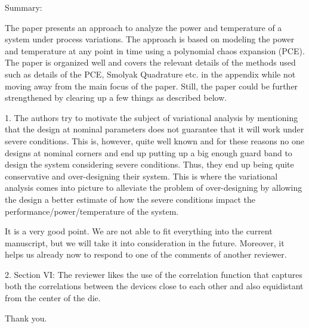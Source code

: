 \begin{reviewer}
Summary:

The paper presents an approach to analyze the power and temperature of a system under process variations. The approach is based on modeling the power and temperature at any point in time using a polynomial chaos expansion (PCE). The paper is organized well and covers the relevant details of the methods used such as details of the PCE, Smolyak Quadrature etc. in the appendix while not moving away from the main focus of the paper. Still, the paper could be further strengthened by clearing up a few things as described below.

1. The authors try to motivate the subject of variational analysis by mentioning that the design at nominal parameters does not guarantee that it will work under severe conditions. This is, however, quite well known and for these reasons no one designs at nominal corners and end up putting up a big enough guard band to design the system considering severe conditions. Thus, they end up being quite conservative and over-designing their system. This is where the variational analysis comes into picture to alleviate the problem of over-designing by allowing the design a better estimate of how the severe conditions impact the performance/power/temperature of the system.
\end{reviewer}
\begin{authors}
It is a very good point.
We are not able to fit everything into the current manuscript, but we will take it into consideration in the future.
Moreover, it helps us already now to respond to one of the comments of another reviewer.
\end{authors}

\begin{reviewer}
2. Section VI: The reviewer likes the use of the correlation function that captures both the correlations between the devices close to each other and also equidistant from the center of the die.
\end{reviewer}
\begin{authors}
Thank you.
\end{authors}

